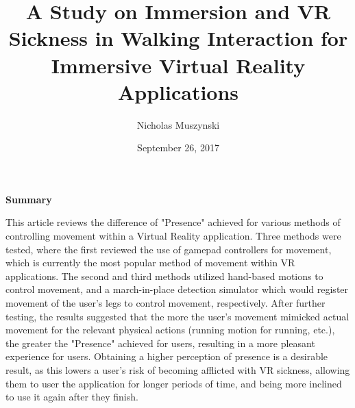 \documentclass{article}
\begin{document}
\title{A Study on Immersion and VR Sickness in Walking Interaction for Immersive Virtual Reality Applications}
\author{Nicholas Muszynski}
\date{September 26, 2017}

\maketitle

\textbf{Summary}
\newline

This article reviews the difference of "Presence" achieved for various methods of controlling movement within a Virtual Reality application. Three methods were tested, where the first reviewed the use of gamepad controllers for movement, which is currently the most popular method of movement within VR applications. The second and third methods utilized hand-based motions to control movement, and a march-in-place detection simulator which would register movement of the user's legs to control movement, respectively. After further testing, the results suggested that the more the user's movement mimicked actual movement for the relevant physical actions (running motion for running, etc.), the greater the "Presence" achieved for users, resulting in a more pleasant experience for users. Obtaining a higher perception of presence is a desirable result, as this lowers a user's risk of becoming afflicted with VR sickness, allowing them to user the application for longer periods of time, and being more inclined to use it again after they finish.

\nocite{article1cite}



\end{document}
